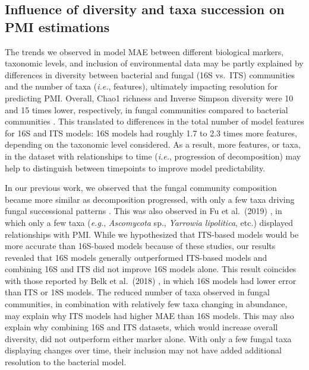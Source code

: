 \documentclass[
  10pt,
  letterpaper,
]{article}
\begin{document}
\hypertarget{influence-of-diversity-and-taxa-succession-on-pmi-estimations}{%
\subsection{Influence of diversity and taxa succession on PMI
estimations}\label{influence-of-diversity-and-taxa-succession-on-pmi-estimations}}

The trends we observed in model MAE between different biological
markers, taxonomic levels, and inclusion of environmental data may be
partly explained by differences in diversity between bacterial and
fungal (16S vs.~ITS) communities and the number of taxa (\emph{i.e.},
features), ultimately impacting resolution for predicting PMI. Overall,
Chao1 richness and Inverse Simpson diversity were 10 and 15 times lower,
respectively, in fungal communities compared to bacterial communities
\citep{mason_body_2022}. This translated to differences in the total
number of model features for 16S and ITS models: 16S models had roughly
1.7 to 2.3 times more features, depending on the taxonomic level
considered. As a result, more features, or taxa, in the dataset with
relationships to time (\emph{i.e.}, progression of decomposition) may
help to distinguish between timepoints to improve model predictability.

In our previous work, we observed that the fungal community composition
became more similar as decomposition progressed, with only a few taxa
driving fungal successional patterns \citep{mason_body_2022}. This was
also observed in Fu et al.~(2019) \citep{fu_fungal_2019}, in which only
a few taxa (\emph{e.g.}, \emph{Ascomycota} sp., \emph{Yarrowia
lipolitica}, etc.) displayed relationships with PMI. While we
hypothesized that ITS-based models would be more accurate than 16S-based
models because of these studies, our results revealed that 16S models
generally outperformed ITS-based models and combining 16S and ITS did
not improve 16S models alone. This result coincides with those reported
by Belk et al.~(2018) \citep{belk_microbiome_2018}, in which 16S models
had lower error than ITS or 18S models. The reduced number of taxa
observed in fungal communities, in combination with relatively few taxa
changing in abundance, may explain why ITS models had higher MAE than
16S models. This may also explain why combining 16S and ITS datasets,
which would increase overall diversity, did not outperform either marker
alone. With only a few fungal taxa displaying changes over time, their
inclusion may not have added additional resolution to the bacterial
model.
\end{document}
